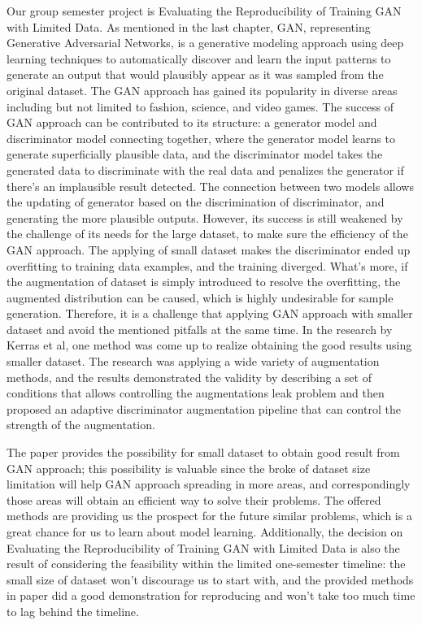 \documentclass{report}
\begin{document}
Our group semester project is Evaluating the Reproducibility of Training GAN with Limited Data.
As mentioned in the last chapter, GAN, representing Generative Adversarial Networks, is a generative modeling approach using deep learning techniques to automatically discover and learn the input patterns to generate an output that would plausibly appear as it was sampled from the original dataset\cite{goodfellow2014generative}. The GAN approach has gained its popularity in diverse areas including but not limited to fashion, science, and video games\cite{gui2020review}. The success of GAN approach can be contributed to its structure: a generator model and discriminator model connecting together, where the generator model learns to generate superficially plausible data, and the discriminator model takes the generated data to discriminate with the real data and penalizes the generator if there’s an implausible result detected\cite{creswell2018generative}. The connection between two models allows the updating of generator based on the discrimination of discriminator, and generating the more plausible outputs\cite{radford2015unsupervised}. However, its success is still weakened by the challenge of its needs for the large dataset, to make sure the efficiency of the GAN approach. The applying of small dataset makes the discriminator ended up overfitting to training data examples, and the training diverged\cite{zhao2020improved}. What’s more, if the augmentation of dataset is simply introduced to resolve the overfitting, the augmented distribution can be caused, which is highly undesirable for sample generation.\cite{zhao2020improved} Therefore, it is a challenge that applying GAN approach with smaller dataset and avoid the mentioned pitfalls at the same time. In the research by Kerras et al\cite{karras2020training}, one method was come up to realize obtaining the good results using smaller dataset. The research was applying a wide variety of augmentation methods, and the results demonstrated the validity by describing a set of conditions that allows controlling the augmentations leak problem and then proposed an adaptive discriminator augmentation pipeline that can control the strength of the augmentation. 

The paper provides the possibility for small dataset to obtain good result from GAN approach; this possibility is valuable since the broke of dataset size limitation will help GAN approach spreading in more areas, and correspondingly those areas will obtain an efficient way to solve their problems. 
The offered methods are providing us the prospect for the future similar problems, which is a great chance for us to learn about model learning. Additionally, the decision on Evaluating the Reproducibility of Training GAN with Limited Data is also the result of considering the feasibility within the limited one-semester timeline: 
the small size of dataset won’t discourage us to start with, and the provided methods in paper did a good demonstration for reproducing and won’t take too much time to lag behind the timeline.
\end{document}

